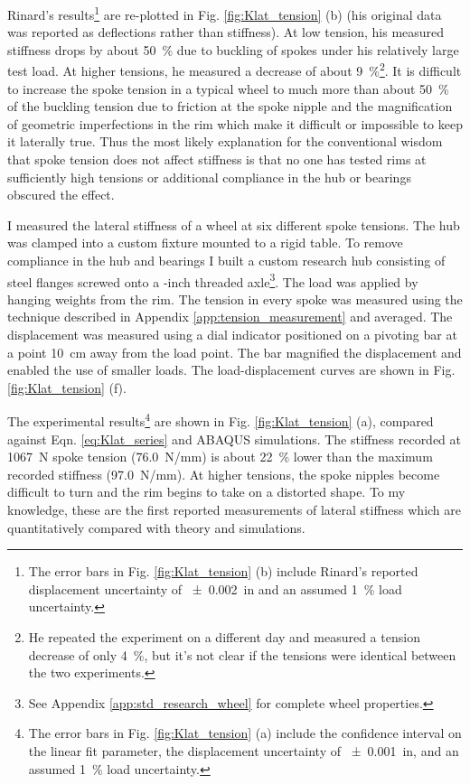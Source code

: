 \documentclass[\rootdir/thesis.tex]{subfiles}
\begin{document}
Rinard's results\footnote{The error bars in Fig. \ref{fig:Klat_tension} (b) include Rinard's reported displacement uncertainty of \SI{+-0.002}{in} and an assumed \SI{1}{\percent} load uncertainty.} are re-plotted in Fig. \ref{fig:Klat_tension} (b) (his original data was reported as deflections rather than stiffness). At low tension, his measured stiffness drops by about \SI{50}{\percent} due to buckling of spokes under his relatively large test load. At higher tensions, he measured a decrease of about \SI{9}{\percent}\footnote{He repeated the experiment on a different day and measured a tension decrease of only \SI{4}{\percent}, but it's not clear if the tensions were identical between the two experiments.}. It is difficult to increase the spoke tension in a typical wheel to much more than about \SI{50}{\percent} of the buckling tension due to friction at the spoke nipple and the magnification of geometric imperfections in the rim which make it difficult or impossible to keep it laterally true. Thus the most likely explanation for the conventional wisdom that spoke tension does not affect stiffness is that no one has tested rims at sufficiently high tensions or additional compliance in the hub or bearings obscured the effect.

I measured the lateral stiffness of a wheel at six different spoke tensions. The hub was clamped into a custom fixture mounted to a rigid table. To remove compliance in the hub and bearings I built a custom research hub consisting of steel flanges screwed onto a -inch threaded axle\footnote{See Appendix \ref{app:std_research_wheel} for complete wheel properties.}. The load was applied by hanging weights from the rim. The tension in every spoke was measured using the technique described in Appendix \ref{app:tension_measurement} and averaged. The displacement was measured using a dial indicator positioned on a pivoting bar at a point \SI{10}{cm} away from the load point. The bar magnified the displacement and enabled the use of smaller loads. The load-displacement curves are shown in Fig. \ref{fig:Klat_tension} (f).

The experimental results\footnote{The error bars in Fig. \ref{fig:Klat_tension} (a) include the confidence interval on the linear fit parameter, the displacement uncertainty of \SI{+-0.001}{in}, and an assumed \SI{1}{\percent} load uncertainty.} are shown in Fig. \ref{fig:Klat_tension} (a), compared against Eqn. \eqref{eq:Klat_series} and ABAQUS simulations. The stiffness recorded at \SI{1067}{N} spoke tension (\SI{76.0}{N/mm}) is about \SI{22}{\percent} lower than the maximum recorded stiffness (\SI{97.0}{N/mm}). At higher tensions, the spoke nipples become difficult to turn and the rim begins to take on a distorted shape. To my knowledge, these are the first reported measurements of lateral stiffness which are quantitatively compared with theory and simulations.
\end{document}
